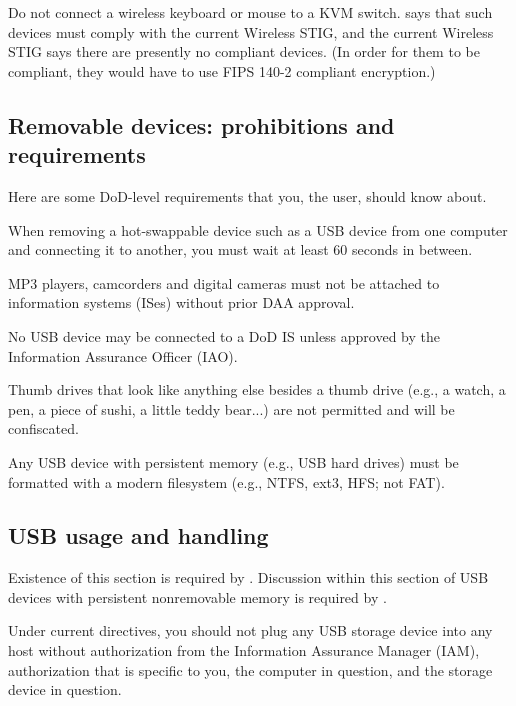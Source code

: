  Do not connect a wireless keyboard
or mouse to a KVM switch.  says that such devices
must comply with the current Wireless STIG, and the current Wireless STIG
says there are presently no compliant devices. (In order for them to be
compliant, they would have to use FIPS 140-2 compliant encryption.)


\subsection{Removable devices: prohibitions and requirements}

Here are some DoD-level requirements that you, the user, should know
about.

 When removing a hot-swappable
device such as a USB device from one computer and connecting it to
another, you must wait at least 60 seconds in between.

 MP3 players, camcorders and digital
cameras must not be attached to information systems (ISes) without prior
DAA approval.

 No USB device may be connected to a
DoD IS unless approved by the Information Assurance Officer (IAO).

 Thumb drives that look like anything
else besides a thumb drive (e.g., a watch, a pen, a piece of sushi, a
little teddy bear...) are not permitted and will be confiscated.

 Any USB device with persistent
memory (e.g., USB hard drives) must be formatted with a modern filesystem
(e.g., NTFS, ext3, HFS; not FAT).


\subsection{USB usage and handling}

 Existence of this section is required
by .  Discussion
within this section of USB devices with persistent nonremovable memory is
required by .

Under current directives, you should not plug any USB storage device into
any host without authorization from the Information Assurance Manager
(IAM), authorization that is specific to you, the computer in question,
and the storage device in question.


